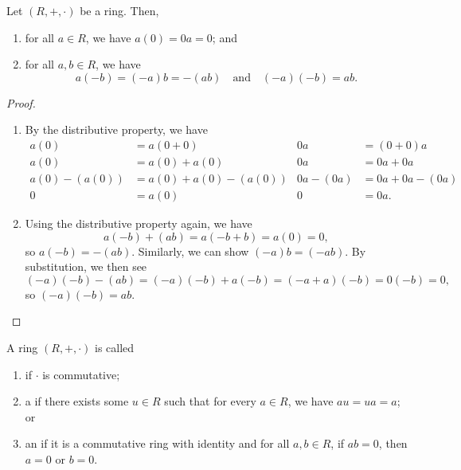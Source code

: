 \begin{prop}
Let $ (R,+,\cdot) $ be a ring. Then,
\begin{enumerate}
    \item for all $ a\in R $, we have $ a(0)=0a=0 $; and
    \item for all $ a,b\in R $, we have
    \begin{equation*}
        a(-b)=(-a)b=-(ab) \quad\text{and}\quad (-a)(-b)=ab.
    \end{equation*}
\end{enumerate}
\end{prop}
\begin{proof}~
\begin{enumerate}
    \item By the distributive property, we have
    \begin{align*}
        a(0) &= a(0+0) & 0a &= (0+0)a \\
        a(0) &= a(0)+a(0) & 0a &= 0a+0a \\
        a(0)-(a(0)) &= a(0)+a(0)-(a(0)) & 0a-(0a) &= 0a+0a-(0a) \\
        0 &= a(0) & 0 &= 0a.
    \end{align*}

    \item Using the distributive property again, we have
    \begin{equation*}
        a(-b)+(ab)=a(-b+b)=a(0)=0,
    \end{equation*}
    so $ a(-b)=-(ab) $. Similarly, we can show $ (-a)b=(-ab) $. By substitution, we then see
    \begin{equation*}
        (-a)(-b)-(ab)=(-a)(-b)+a(-b)=(-a+a)(-b)=0(-b)=0,
    \end{equation*}
    so $ (-a)(-b)=ab $.\qedhere
\end{enumerate}
\end{proof}

\begin{defn}\label{defn:ring_types}
A ring $ (R,+,\cdot) $ is called
\begin{enumerate}
    \item {} if $ \cdot $ is commutative;
    \item a  if there exists some $ u\in R $ such that for every $ a\in R $, we have $ au=ua=a $; or
    \item an  if it is a commutative ring with identity and for all $ a,b\in R $, if $ ab=0 $, then $ a=0 $ or $ b=0 $.
\end{enumerate}
\end{defn}

